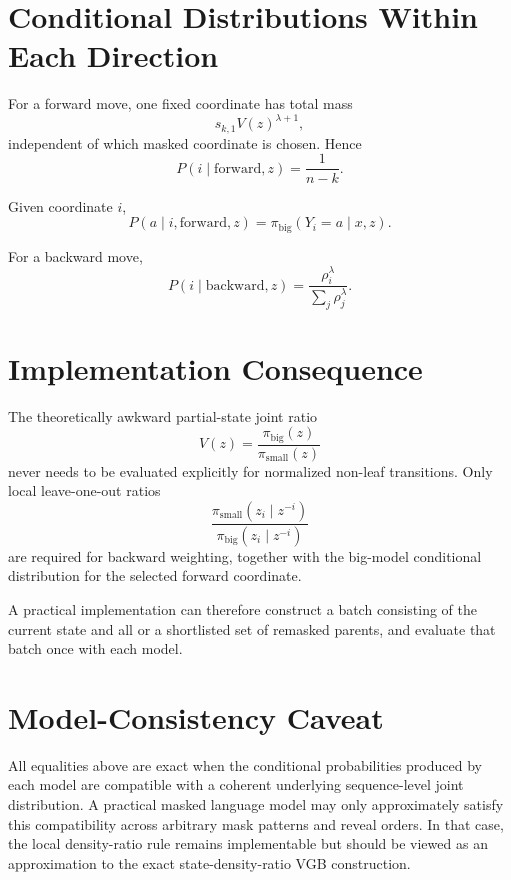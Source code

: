 \documentclass[11pt]{article}
\newcommand{\pb}{\pi_{\mathrm{big}}}
\newcommand{\ps}{\pi_{\mathrm{small}}}
\begin{document}
\section{Conditional Distributions Within Each Direction}

For a forward move, one fixed coordinate has total mass
\begin{equation}
s_{k,1}V(z)^{\lambda+1},
\end{equation}
independent of which masked coordinate is chosen. Hence
\begin{equation}
P(i\mid \text{forward},z)=\frac{1}{n-k}.
\end{equation}

Given coordinate $i$,
\begin{equation}
P(a\mid i,\text{forward},z)
=
\pb(Y_i=a\mid x,z).
\end{equation}

For a backward move,
\begin{equation}
P(i\mid \text{backward},z)
=
\frac{\rho_i^\lambda}{\sum_j\rho_j^\lambda}.
\end{equation}

\section{Implementation Consequence}

The theoretically awkward partial-state joint ratio
\begin{equation}
V(z)=\frac{\pb(z)}{\ps(z)}
\end{equation}
never needs to be evaluated explicitly for normalized non-leaf transitions.
Only local leave-one-out ratios
\begin{equation}
\frac{\ps(z_i\mid z^{-i})}{\pb(z_i\mid z^{-i})}
\end{equation}
are required for backward weighting, together with the big-model conditional distribution for the selected forward coordinate.

A practical implementation can therefore construct a batch consisting of the current state and all or a shortlisted set of remasked parents, and evaluate that batch once with each model.

\section{Model-Consistency Caveat}

All equalities above are exact when the conditional probabilities produced by each model are compatible with a coherent underlying sequence-level joint distribution. A practical masked language model may only approximately satisfy this compatibility across arbitrary mask patterns and reveal orders. In that case, the local density-ratio rule remains implementable but should be viewed as an approximation to the exact state-density-ratio VGB construction.
\end{document}
